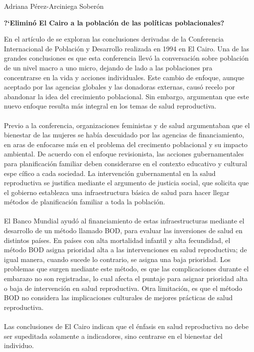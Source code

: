 \documentclass[11pt,spanish,letterpaper]{article}
\theoremstyle{plain}
\begin{document}
\begin{flushleft}
Adriana P\'erez-Arciniega Sober\'on
\end{flushleft}
\begin{center}
\textbf{?`Elimin\'o El Cairo a la poblaci\'on de las pol\'iticas poblacionales?}
\end{center}
En el art\'iculo de \cite{murphy1997elimino} se exploran las conclusiones derivadas de la Conferencia Internacional de Poblaci\'on y Desarrollo realizada en 1994 en El Cairo. Una de las grandes conclusiones es que esta conferencia llev\'o la conversaci\'on sobre poblaci\'on de un nivel macro a uno micro, dejando de lado a las poblaciones pra concentrarse en la vida y acciones individuales. Este cambio de enfoque, aunque aceptado por las agencias globales y las donadoras externas, caus\'o recelo por abandonar la idea del crecimiento poblacional. Sin embargo, \cite{murphy1997elimino} argumentan que este nuevo enfoque resulta m\'as integral en los temas de salud reproductiva.\\
\\
Previo a la conferencia, organizaciones feministas y de salud argumentaban que el bienestar de las mujeres se hab\'ia descuidado por las agencias de financiamiento, en aras de enfocarse m\'as en el problema del crecimento poblacional y su impacto ambiental. De acuerdo con el enfoque revisionista, las acciones gubernamentales para planificaci\'on familiar deben considerarse en el contexto educativo y cultural espe c\'ifico a cada sociedad. La intervenci\'on gubernamental en la salud reproductiva se justifica mediante el argumento de justicia social, que solicita que el gobierno establezca una infraestructura b\'asica de salud para hacer llegar m\'etodos de planificaci\'on familiar a toda la poblaci\'on.\\
\\
El Banco Mundial ayud\'o al financiamiento de estas infraestructuras mediante el desarrollo de un m\'etodo llamado BOD, para evaluar las inversiones de salud en distintos pa\'ises. En pa\'ises con alta mortalidad infantil y alta fecundidad, el m\'etodo BOD asigna prioridad alta a las intervenciones en salud reproductiva; de igual manera, cuando sucede lo contrario, se asigna una baja prioridad. Los problemas que surgen mediante este m\'etodo, es que las complicaciones durante el embarazo no son registradas, lo cual afecta el puntaje para asignar prioridad alta o baja de intervenci\'on en salud reproductiva. Otra limitaci\'on, es que el m\'etodo BOD no considera las implicaciones culturales de mejores pr\'acticas de salud reproductiva.\\
\\
Las conclusiones de El Cairo indican que el \'enfasis en salud reproductiva no debe ser supeditada solamente a indicadores, sino centrarse en el bienestar del individuo.


\end{document}
